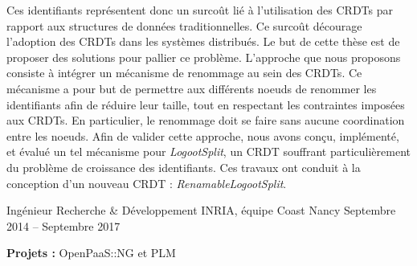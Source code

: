 \documentclass[12pt, a4paper]{awesome-cv}
\begin{document}
\begin{cventries}
\begin{cvparagraph}
  Ces identifiants représentent donc un surcoût lié à l'utilisation des \acp{CRDT} par rapport aux structures de données traditionnelles.
  Ce surcoût décourage l'adoption des \acp{CRDT} dans les systèmes distribués.
  Le but de cette thèse est de proposer des solutions pour pallier ce problème.
  L'approche que nous proposons consiste à intégrer un mécanisme de renommage au sein des \acp{CRDT}.
  Ce mécanisme a pour but de permettre aux différents noeuds de renommer les identifiants afin de réduire leur taille, tout en respectant les contraintes imposées aux \acp{CRDT}.
  En particulier, le renommage doit se faire sans aucune coordination entre les noeuds.
  Afin de valider cette approche, nous avons conçu, implémenté, et évalué un tel mécanisme pour \emph{LogootSplit}, un \ac{CRDT} souffrant particulièrement du problème de croissance des identifiants.
  Ces travaux ont conduit à la conception d'un nouveau \ac{CRDT} : \emph{RenamableLogootSplit}.

  \begin{description}[labelindent=1.6em,itemsep=-0.3em]
    \item {}
    \item {}
  \end{description}
\end{cvparagraph}

\cventry
  {Ingénieur Recherche \& Développement} %
  {INRIA, équipe Coast} %
  {Nancy} %
  {Septembre 2014 – Septembre 2017} %
  {
    \begin{cvitems} %
      \item {\textbf{Projets :} OpenPaaS::NG et PLM}
    \end{cvitems}
  }



\end{cventries}
\end{document}
